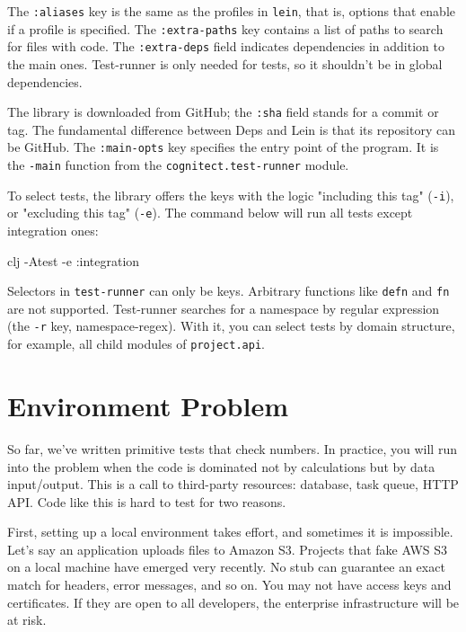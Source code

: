 The \verb|:aliases| key is the same as the profiles in \verb|lein|, that is, options that enable if a profile is specified. The \verb|:extra-paths| key contains a list of paths to search for files with code. The \verb|:extra-deps| field indicates dependencies in addition to the main ones. Test-runner is only needed for tests, so it shouldn't be in global dependencies.

The library is downloaded from GitHub; the \verb|:sha| field stands for a commit or tag. The fundamental difference between Deps and Lein is that its repository can be GitHub. The \verb|:main-opts| key specifies the entry point of the program. It is the \verb|-main| function from the \verb|cognitect.test-runner| module.

To select tests, the library offers the keys with the logic "including this tag" (\verb|-i|), or "excluding this tag" (\verb|-e|). The command below will run all tests except integration ones:

\begin{english}
  \begin{bash}
clj -Atest -e :integration
  \end{bash}
\end{english}

Selectors in \verb|test-runner| can only be keys. Arbitrary functions like \verb|defn| and \verb|fn| are not supported. Test-runner searches for a namespace by regular expression (the \verb|-r| key, namespace-regex). With it, you can select tests by domain structure, for example, all child modules of \verb|project.api|.

\section{Environment Problem}


So far, we've written primitive tests that check numbers. In practice, you will run into the problem when the code is dominated not by calculations but by data input/output. This is a call to third-party resources: database, task queue, HTTP API. Code like this is hard to test for two reasons.


First, setting up a local environment takes effort, and sometimes it is impossible. Let's say an application uploads files to Amazon S3. Projects that fake AWS S3 on a local machine have emerged very recently. No stub can guarantee an exact match for headers, error messages, and so on. You may not have access keys and certificates. If they are open to all developers, the enterprise infrastructure will be at risk.

